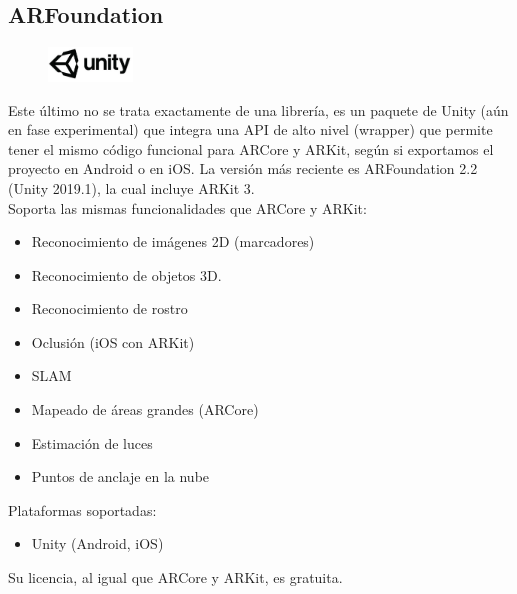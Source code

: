 \clearpage
\subsection{ARFoundation}
\begin{figure}[H]
    \centering
    \includegraphics[width=0.2\textwidth]{Images/Unity_Logo.jpeg}
    \label{fig:my_label}
\end{figure}

Este último no se trata exactamente de una librería, es un paquete de Unity (aún en fase experimental) que integra una API de alto nivel (wrapper) que permite tener el mismo código funcional para ARCore y ARKit, según si exportamos el proyecto en Android o en iOS. La versión más reciente es ARFoundation 2.2 (Unity 2019.1), la cual incluye ARKit 3.\cite{ARFoundation}\\
Soporta las mismas funcionalidades que ARCore y ARKit:
\begin{itemize}
\item Reconocimiento de imágenes 2D (marcadores)
\item Reconocimiento de objetos 3D.
\item Reconocimiento de rostro 
\item Oclusión (iOS con ARKit)
\item SLAM
\item Mapeado de áreas grandes (ARCore)
\item Estimación de luces
\item Puntos de anclaje en la nube
\end{itemize}

Plataformas soportadas:
\begin{itemize}
\item Unity (Android, iOS)
\end{itemize}

Su licencia, al igual que ARCore y ARKit, es gratuita.

\noindent